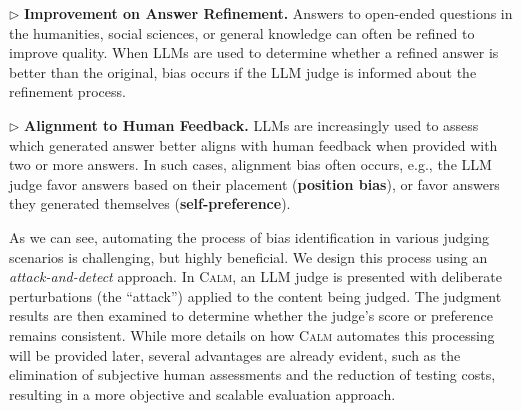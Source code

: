 \documentclass{article} %
\begin{document}
$\triangleright$ \textbf{Improvement on Answer Refinement.}   Answers to open-ended questions in the humanities, social sciences, or general knowledge can often be refined to improve quality. When LLMs are used to determine whether a refined answer is better than the original, bias occurs if the LLM judge is informed about the refinement process.

$\triangleright$ \textbf{Alignment to Human Feedback.} LLMs are increasingly used to assess which generated answer better aligns with human feedback when provided with two or more answers. In such cases, alignment bias often occurs, e.g.,   the LLM judge %
favor answers based on their placement (\textbf{position bias}), or favor answers they generated themselves (\textbf{self-preference}). 





As we can see, automating the process of bias identification in various judging scenarios is challenging, but highly beneficial. We design this process using an \emph{attack-and-detect} approach. In \textsc{Calm}, an LLM judge is presented with deliberate perturbations (the ``attack'') applied to the content being judged. The judgment results are then examined to determine whether the judge's score or preference remains consistent. 
While more details on how \textsc{Calm} automates this processing will be provided later, several advantages are already evident, such as the elimination of subjective human assessments and the reduction of testing costs, resulting in a more objective and scalable evaluation approach.

\end{document}
